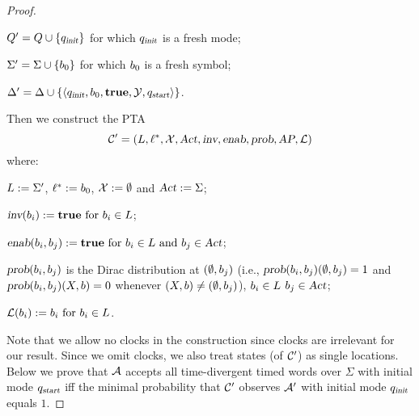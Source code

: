 \begin{proof}
\begin{compactitem}
\item $Q'   = Q  \cup \{ q_{\mbox{\sl\scriptsize init} } \}$ for which $q_{\mbox{\sl\scriptsize init} }$ is a fresh mode;
\item $\Sigma'  = \Sigma \cup \{ b_{0} \}$ for which $b_{0}$ is a fresh symbol;
\item $\Delta'     = \Delta    \cup \{ \langle
            q_{\mbox{\sl\scriptsize init} },
            b_{0},
            \mathbf{true},
            \mathcal{Y},
            q_{\mbox{\sl\scriptsize start}}
        \rangle
    \}$.
\end{compactitem}
Then we construct the PTA
\[
\mathcal{C}'=\left(L, \ell^*, \mathcal{X}, \mbox{\sl Act}, \mbox{\sl inv}, \mbox{\sl enab},  \mbox{\sl prob}, \mbox{\sl AP}, \mathcal{L}\right)
\]
where:
\begin{compactitem}
    \item $L      :=  \Sigma'$, $\ell^*     :=  b_{0} $, $\mathcal{X}    :=  \emptyset $ and $\mbox{\sl Act}      :=  \Sigma $;
    \item $\mbox{\sl inv}(b_{i})              :=  \mathbf{true}
                                            \text{ for }
                                            b_{i} \in L$;
    \item $\mbox{\sl enab}(b_{i},b_{j})   :=  \mathbf{true}
                                            \text{ for }
                                            b_{i} \in L
                                            \text{ and }
                                            b_{j} \in \mbox{\sl Act}$;
    \item $\mbox{\sl prob}(b_{i},b_{j})$ is the Dirac distribution at $(\emptyset,b_{j})$ (i.e., $\mbox{\sl prob}(b_{i},b_{j})(\emptyset,b_{j})=1$ and $\mbox{\sl prob}(b_{i},b_{j})(X,b)=0$ whenever $(X,b)\ne(\emptyset,b_{j})$),
                                            $b_{i} \in L$
                                            $b_{j} \in \mbox{\sl Act}$;
    \item $\mathcal{L}(b_{i})           :=  b_{i}
                                            \text{ for } b_{i} \in L$.
\end{compactitem}
Note that we allow no clocks in the construction since clocks are irrelevant for our result.
Since we omit clocks, we also treat states (of $\mathcal{C}'$) as single locations.
Below we prove that $\mathcal{A}$ accepts all time-divergent timed words over $\Sigma$ with initial mode $q_{\mbox{\sl\scriptsize start}}$ iff
the minimal probability that $\mathcal{C}'$ observes $\mathcal{A}'$ with initial mode $q_{\mbox{\sl\scriptsize init} }$ equals $1$.


\end{proof}
